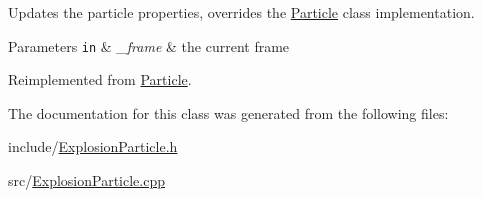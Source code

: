 Updates the particle properties, overrides the \hyperlink{classParticle}{Particle} class implementation. 


\begin{DoxyParams}[1]{Parameters}
\mbox{\tt in}  & {\em \-\_\-frame} & the current frame \\
\hline
\end{DoxyParams}


Reimplemented from \hyperlink{classParticle_a842b0304310e8e8e92119563bbefe8a9}{Particle}.



The documentation for this class was generated from the following files\-:\begin{DoxyCompactItemize}
\item 
include/\hyperlink{ExplosionParticle_8h}{Explosion\-Particle.\-h}\item 
src/\hyperlink{ExplosionParticle_8cpp}{Explosion\-Particle.\-cpp}\end{DoxyCompactItemize}
